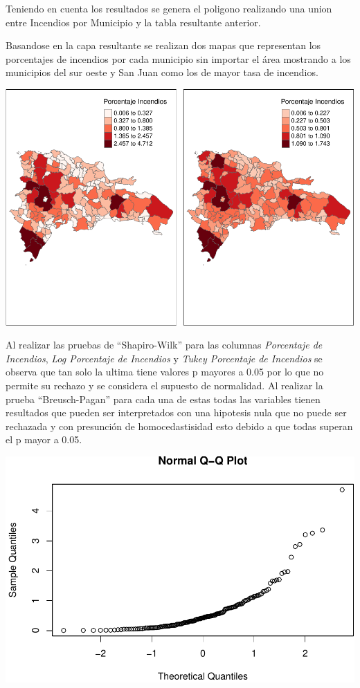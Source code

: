 \documentclass[11pt,]{article}
\newenvironment{Shaded}{\begin{snugshade}}{\end{snugshade}}
\newcommand{\KeywordTok}[1]{\textcolor[rgb]{0.13,0.29,0.53}{\textbf{#1}}}
\newcommand{\CommentTok}[1]{\textcolor[rgb]{0.56,0.35,0.01}{\textit{#1}}}
\newcommand{\OperatorTok}[1]{\textcolor[rgb]{0.81,0.36,0.00}{\textbf{#1}}}
\newcommand{\NormalTok}[1]{#1}
\begin{document}
Teniendo en cuenta los resultados se genera el poligono realizando una
union entre Incendios por Municipio y la tabla resultante anterior.

Basandose en la capa resultante se realizan dos mapas que representan
los porcentajes de incendios por cada municipio sin importar el área
mostrando a los municipios del sur oeste y San Juan como los de mayor
tasa de incendios.

\includegraphics{proyecto_files/figure-latex/unnamed-chunk-21-1.pdf}

Al realizar las pruebas de ``Shapiro-Wilk'' para las columnas
\emph{Porcentaje de Incendios}, \emph{Log Porcentaje de Incendios} y
\emph{Tukey Porcentaje de Incendios} se observa que tan solo la ultima
tiene valores p mayores a 0.05 por lo que no permite su rechazo y se
considera el supuesto de normalidad. Al realizar la prueba
``Breusch-Pagan'' para cada una de estas todas las variables tienen
resultados que pueden ser interpretados con una hipotesis nula que no
puede ser rechazada y con presunción de homocedastisidad esto debido a
que todas superan el p mayor a 0.05.

\begin{Shaded}
\end{Shaded}

\includegraphics{proyecto_files/figure-latex/unnamed-chunk-22-1.pdf}
\end{document}
